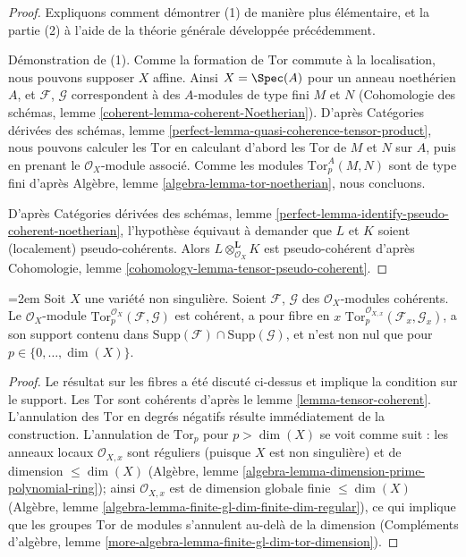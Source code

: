 \begin{proof}
Expliquons comment démontrer (1) de manière plus élémentaire, et la partie (2)
à l'aide de la théorie générale développée précédemment.

\medskip\noindent
Démonstration de (1). Comme la formation de $\text{Tor}$ commute à la localisation,
nous pouvons supposer $X$ affine. Ainsi $X = \Spec(A)$ pour un anneau noethérien
$A$, et $\mathcal{F}$, $\mathcal{G}$ correspondent à des $A$-modules de type fini
$M$ et $N$ (Cohomologie des schémas, lemme
\ref{coherent-lemma-coherent-Noetherian}).
D'après Catégories dérivées des schémas, lemme
\ref{perfect-lemma-quasi-coherence-tensor-product}, nous pouvons
calculer les $\text{Tor}$ en calculant d'abord les $\text{Tor}$
de $M$ et $N$ sur $A$, puis en prenant le $\mathcal{O}_X$-module associé.
Comme les modules $\text{Tor}_p^A(M, N)$ sont de type fini d'après
Algèbre, lemme \ref{algebra-lemma-tor-noetherian},
nous concluons.

\medskip\noindent
D'après Catégories dérivées des schémas, lemme
\ref{perfect-lemma-identify-pseudo-coherent-noetherian},
l'hypothèse équivaut à demander que $L$ et $K$ soient
(localement) pseudo-cohérents. Alors $L \otimes_{\mathcal{O}_X}^\mathbf{L} K$
est pseudo-cohérent d'après
Cohomologie, lemme \ref{cohomology-lemma-tensor-pseudo-coherent}.
\end{proof}

\begin{lemma}
\label{lemma-compute-tor-nonsingular}
{\emergencystretch=2em Soit $X$ une variété non singulière.
Soient $\mathcal{F}$, $\mathcal{G}$ des $\mathcal{O}_X$-modules cohérents.
Le $\mathcal{O}_X$-module
$\text{Tor}_p^{\mathcal{O}_X}(\mathcal{F}, \mathcal{G})$
est cohérent, a pour fibre en $x$
$\text{Tor}_p^{\mathcal{O}_{X, x}}(\mathcal{F}_x, \mathcal{G}_x)$,
a son support contenu dans
$\text{Supp}(\mathcal{F}) \cap \text{Supp}(\mathcal{G})$, et
n'est non nul que pour $p \in \{0, \ldots, \dim(X)\}$.\par}
\end{lemma}

\begin{proof}
Le résultat sur les fibres a été discuté ci-dessus et implique la condition
sur le support. Les $\text{Tor}$ sont cohérents d'après
le lemme \ref{lemma-tensor-coherent}. L'annulation des $\text{Tor}$
en degrés négatifs résulte immédiatement de la construction. L'annulation
de $\text{Tor}_p$ pour $p > \dim(X)$ se voit comme suit :
les anneaux locaux $\mathcal{O}_{X, x}$ sont réguliers
(puisque $X$ est non singulière) et de dimension $\leq \dim(X)$
(Algèbre, lemme \ref{algebra-lemma-dimension-prime-polynomial-ring});
ainsi $\mathcal{O}_{X, x}$ est de dimension globale finie $\leq \dim(X)$
(Algèbre, lemme \ref{algebra-lemma-finite-gl-dim-finite-dim-regular}),
ce qui implique que les groupes $\text{Tor}$ de modules s'annulent au-delà de la dimension
(Compléments d'algèbre, lemme \ref{more-algebra-lemma-finite-gl-dim-tor-dimension}).
\end{proof}


